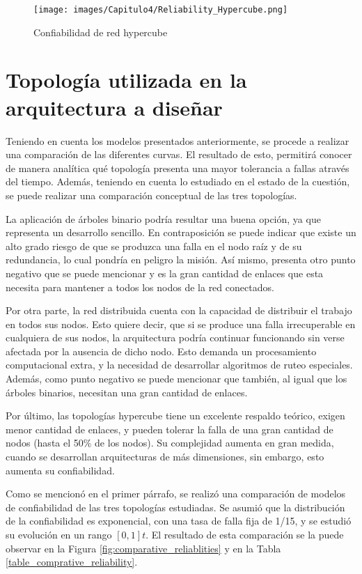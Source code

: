\begin{figure}[H]
 \centering
 \texttt{[image: images/Capitulo4/Reliability\_Hypercube.png]}
  \caption{Confiabilidad de red hypercube}
\label{fig:Reliability_Hypercube}
\end{figure}

\section{Topología utilizada en la arquitectura a diseñar}

Teniendo en cuenta los modelos presentados anteriormente, se procede a realizar una comparación de las diferentes curvas. El resultado de esto, permitirá conocer de manera analítica qué topología presenta una mayor tolerancia a fallas através del tiempo. Además, teniendo en cuenta lo estudiado en el estado de la cuestión, se puede realizar una comparación conceptual de las tres topologías.

La aplicación de árboles binario podría resultar una buena opción, ya que representa un desarrollo sencillo. En contraposición se puede indicar que existe un alto grado riesgo de que se produzca una falla en el nodo raíz y de su redundancia, lo cual pondría en peligro la misión. Así mismo, presenta otro punto negativo que se puede mencionar y es la gran cantidad de enlaces que esta necesita para mantener a todos los nodos de la red conectados.

Por otra parte, la red distribuida cuenta con la capacidad de distribuir el trabajo en todos sus nodos. Esto quiere decir, que si se produce una falla irrecuperable en cualquiera de sus nodos, la arquitectura podría continuar funcionando sin verse afectada por la ausencia de dicho nodo. Esto demanda un procesamiento computacional extra, y la necesidad de desarrollar algoritmos de ruteo especiales. Además, como punto negativo se puede mencionar que también, al igual que los árboles binarios, necesitan una gran cantidad de enlaces.

Por último, las topologías hypercube tiene un excelente respaldo teórico, exigen menor cantidad de enlaces, y pueden tolerar la falla de una gran cantidad de nodos (hasta el 50\% de los nodos). Su complejidad aumenta en gran medida, cuando se desarrollan arquitecturas de más dimensiones, sin embargo, esto aumenta su confiabilidad.

Como se mencionó en el primer párrafo, se realizó una comparación de modelos de confiabilidad de las tres topologías estudiadas. Se asumió que la distribución de la confiabilidad es exponencial, con una tasa de falla fija de 1/15, y se estudió su evolución en un rango $[0,1]t$. El resultado de esta comparación se la puede observar en la Figura \ref{fig:comparative_reliablities} y en la Tabla \ref{table_comprative_reliability}.

